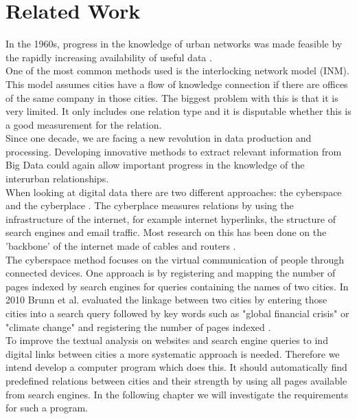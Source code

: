 \section{Related Work}
In the 1960s, progress in the knowledge of urban networks was made feasible by the rapidly increasing availability of useful data \cite{tornqvist1968flows}. \\
One of the most common methods used is the interlocking network model (INM)\cite{taylor2012interlocking}. This model assumes cities have a flow of knowledge connection if there are offices of the same company in those cities. The biggest problem with this is that it is very limited. It only includes one relation type and it is disputable whether this is a good measurement for the relation. \\

Since one decade, we are facing a new revolution in data production and processing. Developing innovative methods to extract relevant information from Big Data could again allow important progress in the knowledge of the interurban relationships. \\

When looking at digital data there are two different approaches: the cyberspace and the cyberplace \cite{devriendt2008cyberplace}. The cyberplace measures relations by using the infrastructure of the internet, for example internet hyperlinks, the structure of search engines and email traffic. Most research on this has been done on the 'backbone' of the internet made of cables and routers \cite{choi2006comparing, gorman2000networks}. \\

The cyberspace method focuses on the virtual communication of people through connected devices. One approach is by registering and mapping the number of pages indexed by search engines for queries containing the names of two cities\cite{devriendt2008cyberplace, janc2015visibility, janc2015geography}. 
In 2010 Brunn et al. evaluated the linkage between two cities by entering those cities into a search query followed by key words such as "global financial crisis" or "climate change" and registering the number of pages indexed \cite{brunn2010networks}. \\

To improve the textual analysis on websites and search engine queries to ind digital links between cities a more systematic approach is needed.  Therefore we intend develop a computer program which does this. It should automatically find predefined relations between cities and their strength by using all pages available from search engines. In the following chapter we will investigate the requirements for such a program.


